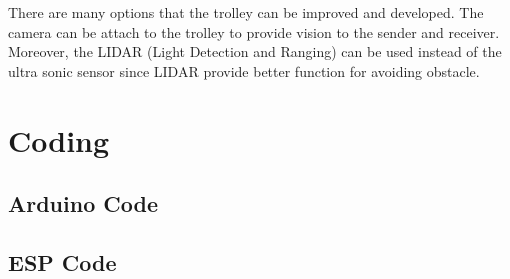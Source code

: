 \documentclass[12pt]{article}
\begin{document}
There are many options that the trolley can be improved and developed. The camera can be attach to the trolley to provide vision to the sender and receiver. Moreover, the LIDAR (Light Detection and Ranging) can be used instead of the ultra sonic sensor since LIDAR provide better function for avoiding obstacle. 

\nocite{*}



\newpage

\appendix
\section{Coding} \label{sec:coding}
\subsection{Arduino Code} \label{sub:acode}
\texttt{}
\subsection{ESP Code} \label{sub:ecode}
\texttt{}
\end{document}
